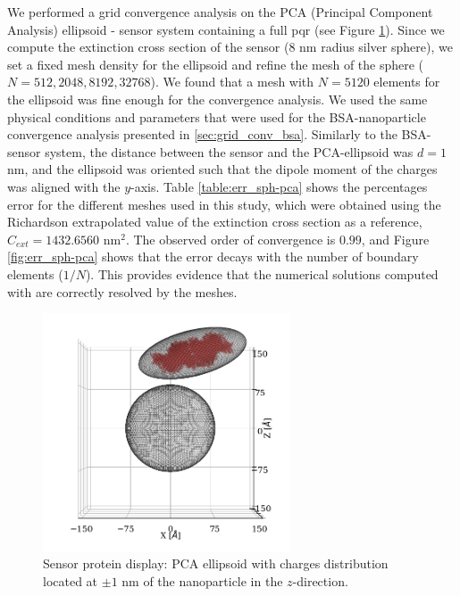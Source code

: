 We performed a grid convergence analysis on the PCA (Principal Component Analysis) ellipsoid - sensor system containing a full pqr (see Figure \ref{fig:one_pca_sketch}). 
Since we compute the extinction cross section of the sensor (8 nm radius silver sphere), we set a fixed mesh density for the ellipsoid and refine 
the mesh of the sphere ($N=512, 2048, 8192, 32768$). We found that a mesh with $N=5120$ elements for the ellipsoid was fine enough for the convergence analysis.
We used the same physical conditions and parameters that were used for the BSA-nanoparticle convergence analysis presented in
\ref{sec:grid_conv_bsa}. Similarly to the BSA-sensor system, the distance between the sensor and the PCA-ellipsoid 
was $d=1$ nm, and the ellipsoid was oriented such that the dipole moment of the charges was aligned with the $y$-axis. 
Table \ref{table:err_sph-pca} shows the percentages error for the different meshes used in this study, which were 
obtained using the Richardson extrapolated value of the extinction cross section as a reference, $C_{ext} = 1432.6560$ nm$^2$. The observed order
of convergence is $0.99$, and Figure \ref{fig:err_sph-pca} shows that the error decays with the number of boundary elements ($1/N$). This provides
evidence that the numerical solutions computed with \pygbe are correctly resolved by the meshes.  

\begin{figure}%
    \centering
    \includegraphics[width=0.65\textwidth]{viz/one_pca_full_display.png} 
    \caption{Sensor protein display: PCA ellipsoid with charges distribution located at $\pm 1$ nm of the 
    nanoparticle in the $z$-direction.}
    \label{fig:one_pca_sketch}
 \end{figure}


